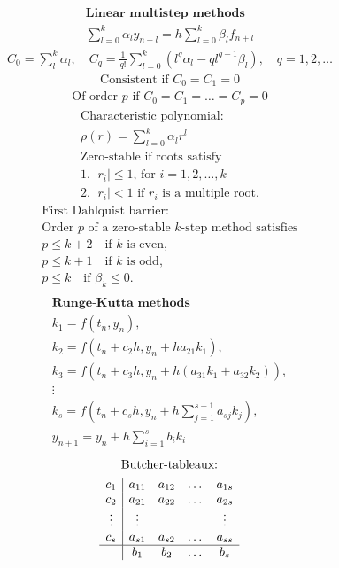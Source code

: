 \documentclass[10pt, a4paper]{article}
\begin{document}
\begin{gather*}
    \textbf{Linear multistep methods} \\
    \sum_{l=0}^k \alpha_l y_{n+l} = h \sum_{l=0}^k \beta_l f_{n+l}
\end{gather*}
\begin{gather*}
    C_0 = \sum_l^k\alpha_l, \quad C_q = \frac{1}{q!}\sum_{l=0}^k(l^q\alpha_l-ql^{q-1}\beta_l), \quad q = 1,2,\dots
\end{gather*}
\begin{gather*}
    \text{Consistent if $C_0 = C_1 = 0$}
\end{gather*}
\begin{gather*}
    \text{Of order $p$ if $C_0 = C_1 = \dots = C_p = 0$}
\end{gather*}
\begin{gather*}
    \text{Characteristic polynomial:} \\
    \rho(r) = \sum_{l=0}^k\alpha_l r^l \\
    \text{Zero-stable if roots satisfy} \\
    \text{1. $|r_i| \leq 1$, for $i = 1, 2, \dots, k$} \\
    \text{2. $|r_i| < 1$ if $r_i$ is a multiple root.}
\end{gather*}
\begin{gather*}
    \text{First Dahlquist barrier:} \\
    \text{Order $p$ of a zero-stable $k$-step method satisfies} \\
    p \leq k + 2 \quad \text{if $k$ is even,} \\
    p \leq k + 1 \quad \text{if $k$ is odd,} \\
    p \leq k \quad \text{if $\beta_k \leq 0$.} \\
\end{gather*}
\begin{gather*}
    \textbf{Runge-Kutta methods} \\
    k_1 = f(t_n,y_n), \\
    k_2 = f(t_n + c_2h, y_n + ha_{21}k_1), \\
    k_3 = f(t_n + c_3h, y_n + h(a_{31}k_1 + a_{32}k_2)), \\
    \vdots \\
    k_s = f(t_n + c_sh, y_n + h\sum_{j=1}^{s-1}a_{sj}k_j), \\
    y_{n+1} = y_n + h\sum_{i=1}^sb_ik_i
\end{gather*}
\begin{gather*}
    \text{Butcher-tableaux:} \\
    \begin{array}{c|cccc}
        c_1    & a_{11} & a_{12} & \dots & a_{1s} \\
        c_2    & a_{21} & a_{22} & \dots & a_{2s} \\
        \vdots & \vdots &        &       & \vdots \\
        c_s    & a_{s1} & a_{s2} & \dots & a_{ss} \\
        \hline
               & b_1    & b_2    & \dots & b_s
    \end{array}
\end{gather*}
\newpage
\end{document}
